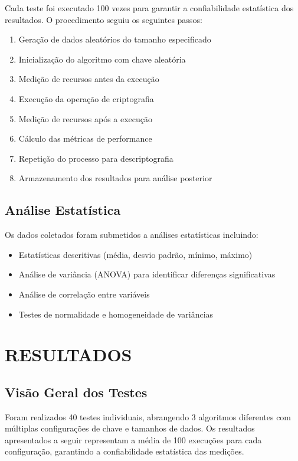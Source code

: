 \documentclass[12pt,a4paper,oneside]{article}
\begin{document}
Cada teste foi executado 100 vezes para garantir a confiabilidade estatística dos resultados. O procedimento seguiu os seguintes passos:

\begin{enumerate}
    \item Geração de dados aleatórios do tamanho especificado
    \item Inicialização do algoritmo com chave aleatória
    \item Medição de recursos antes da execução
    \item Execução da operação de criptografia
    \item Medição de recursos após a execução
    \item Cálculo das métricas de performance
    \item Repetição do processo para descriptografia
    \item Armazenamento dos resultados para análise posterior
\end{enumerate}

\subsection{Análise Estatística}

Os dados coletados foram submetidos a análises estatísticas incluindo:

\begin{itemize}
    \item Estatísticas descritivas (média, desvio padrão, mínimo, máximo)
    \item Análise de variância (ANOVA) para identificar diferenças significativas
    \item Análise de correlação entre variáveis
    \item Testes de normalidade e homogeneidade de variâncias
\end{itemize}

\section{RESULTADOS}

\subsection{Visão Geral dos Testes}

Foram realizados 40 testes individuais, abrangendo 3 algoritmos diferentes com múltiplas configurações de chave e tamanhos de dados. Os resultados apresentados a seguir representam a média de 100 execuções para cada configuração, garantindo a confiabilidade estatística das medições.
\end{document}
